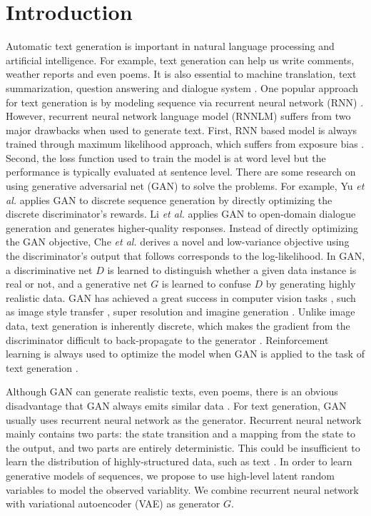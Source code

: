 \documentclass{llncs}
\begin{document}
\section{Introduction}
Automatic text generation is important in natural language processing and artificial intelligence. For example, text generation can help us write comments, weather reports and even poems. It is also essential  to machine translation, text summarization, question answering and dialogue system \cite{mikolov2010recurrent}. 
One popular approach for text generation is by modeling sequence via recurrent neural network (RNN) \cite{mikolov2010recurrent}.  However, recurrent neural network language model (RNNLM) suffers from two major drawbacks when used to generate text. First, RNN based model is always trained through maximum likelihood approach, which suffers from exposure bias \cite{bengio2015scheduled}. Second, the loss function used to train the model is at word level but the performance is typically evaluated at sentence level.
There are some research on using generative adversarial net (GAN) to solve the problems.
For example,
Yu \emph{et al.} \cite{yu2016seqgan:} applies GAN to discrete sequence generation by directly optimizing the discrete discriminator's rewards.
Li \emph{et al.} \cite{Li2017Adversarial} applies GAN to open-domain dialogue generation and generates higher-quality responses. Instead of directly optimizing the GAN objective, Che \emph{et al.} \cite{Che2017Maximum} derives a novel and low-variance objective using the discriminator's output that follows corresponds to the log-likelihood. 
In GAN, a discriminative net $D$ is learned to distinguish whether a given data instance is real or not, and a generative net $G$ is learned to confuse $D$ by generating highly realistic data. GAN has achieved a great success in computer vision tasks \cite{denton2015deep}, such as image style transfer \cite{gatys2015a}, super resolution and imagine generation \cite{radford2016unsupervised}.  
Unlike image data, text generation is inherently discrete, which makes the gradient from the discriminator difficult to back-propagate to the generator \cite{huszar2015how}.
Reinforcement learning is always used to optimize the model when GAN is applied to the task of text generation \cite{yu2016seqgan:}.



Although GAN can generate realistic texts, even poems, there is an obvious disadvantage that
GAN always emits similar data \cite{salimans2016improved}.
For text generation, GAN usually uses recurrent neural network as the generator. Recurrent neural network mainly contains two parts: the state transition and a mapping from the state to the output, and two parts are entirely deterministic. This could be insufficient to learn the distribution of highly-structured data, such as text \cite{chung2015a}. In order to learn generative models of sequences, we propose to use high-level latent random variables to model the observed variablity. We combine recurrent neural network with variational autoencoder (VAE) \cite{kingma2014auto-encoding} as generator $G$.
\end{document}
